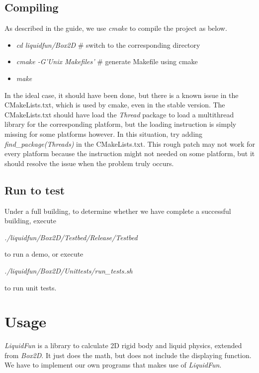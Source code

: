 \documentclass[UTF8]{ctexart}
\begin{document}
        \subsection{Compiling}

            As described in the guide, we use \textit{cmake} to compile the project as below.

            \begin{itemize}
                \item \textit{cd liquidfun/Box2D} \# switch to the corresponding directory
                \item \textit{cmake -G'Unix Makefiles'} \# generate Makefile using cmake
                \item \textit{make}
            \end{itemize}

            In the ideal case, it should have been done, but there is a known issue in the CMakeLists.txt, which is used by cmake, even in the stable version. The CMakeLists.txt should have load the \textit{Thread} package to load a multithread library for the corresponding platform, but the loading instruction is simply missing for some platforms however. In this situation, try adding \textit{find\_package(Threads)} in the CMakeLists.txt. This rough patch may not work for every platform because the instruction might not needed on some platform, but it should resolve the issue when the problem truly occurs.

        \subsection{Run to test}

            Under a full building, to determine whether we have complete a successful building, execute
            
            \textit{./liquidfun/Box2D/Testbed/Release/Testbed}
            
            \noindent to run a demo, or execute
            
            \textit{./liquidfun/Box2D/Unittests/run\_tests.sh}
            
            \noindent to run unit tests.

    \section{Usage}

        \textit{LiquidFun} is a library to calculate 2D rigid body and liquid physics, extended from \textit{Box2D}. It just does the math, but does not include the displaying function. We have to implement our own programs that makes use of \textit{LiquidFun}.
        
\end{document}
